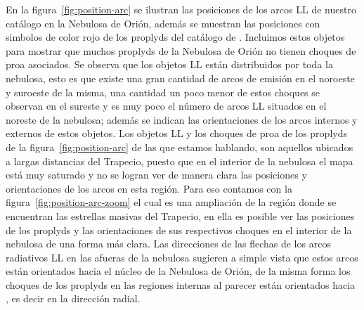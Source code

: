 En la figura~\ref{fig:position-arc} se ilustran las posiciones de los arcos LL de nuestro catálogo en la Nebulosa de Orión, además se muestran las posiciones con simbolos de color rojo de los proplyds del catálogo de \citet{Ricci:2008}. Incluimos estos objetos para mostrar que muchos proplyds de la Nebulosa de Orión no tienen choques de proa asociados. Se observa que los objetos LL están distribuidos por toda la nebulosa, esto es que existe una gran cantidad de arcos de emisión en el noroeste y suroeste de la misma, una cantidad un poco menor de estos choques se observan en el sureste y es muy poco el número de arcos LL situados en el noreste de la nebulosa; además se indican las orientaciones de los arcos internos y externos de estos objetos. Los objetos LL y los choques de proa de los proplyds de la figura~\ref{fig:position-arc} de las que estamos hablando, son aquellos ubicados a largas distancias del Trapecio, puesto que en el interior de la nebulosa el mapa está muy saturado y no se logran ver de manera clara las posiciones y orientaciones de los arcos en esta región. Para eso contamos con la figura~\ref{fig:position-arc-zoom} el cual es una ampliación de la región donde se encuentran las estrellas masivas del Trapecio, en ella es posible ver las posiciones de los proplyds y las orientaciones de sus respectivos choques en el interior de la nebulosa de una forma más clara. Las direcciones de las flechas de los arcos radiativos LL en las afueras de la nebulosa sugieren a simple vista que estos arcos están orientados hacia el núcleo de la Nebulosa de Orión, de la misma forma los choques de los proplyds en las regiones internas al parecer están orientados hacia \thC{}, es decir en la dirección radial.\\


